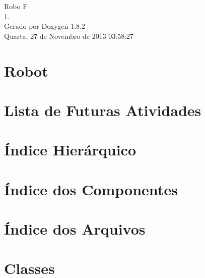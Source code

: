 \documentclass{book}
\begin{document}
\hypersetup{pageanchor=false,citecolor=blue}
\begin{titlepage}
\vspace*{7cm}
\begin{center}
{\Large Robo F \\[1ex]\large 1. }\\
\vspace*{1cm}
{\large Gerado por Doxygen 1.8.2}\\
\vspace*{0.5cm}
{\small Quarta, 27 de Novembro de 2013 03:58:27}\\
\end{center}
\end{titlepage}
\clearemptydoublepage
{}
\tableofcontents
\clearemptydoublepage
{}
\hypersetup{pageanchor=true,citecolor=blue}
\chapter{Robot}
\label{index}\hypertarget{index}{}
\chapter{Lista de Futuras Atividades}
\label{todo}
\hypertarget{todo}{}

\chapter{Índice Hierárquico}

\chapter{Índice dos Componentes}

\chapter{Índice dos Arquivos}

\chapter{Classes}


















\end{document}
